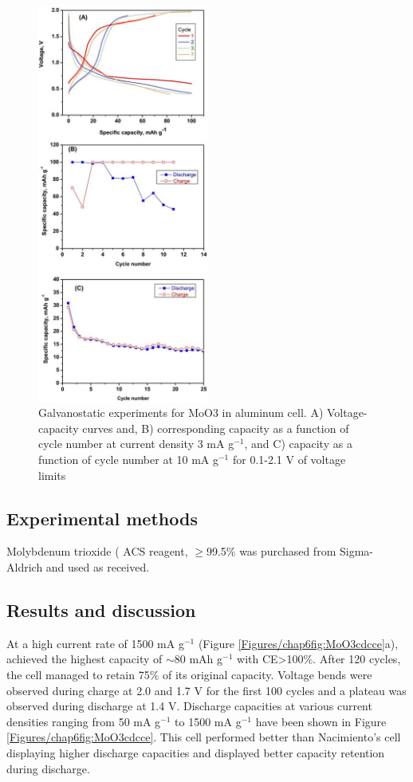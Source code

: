 \begin{figure}[th!]
\centering
\includegraphics[width=0.5\textwidth]{Figures/chap6fig/moo3pap}
\caption{Galvanostatic experiments for MoO3 in aluminum cell. A) Voltage-capacity curves and, B) corresponding capacity as a function of cycle number at current density 3 mA g$^{-1}$, and C) capacity as a function of cycle number at 10 mA g$^{-1}$ for 0.1-2.1 V of voltage limits \cite{nacimiento_exploring_2018}}
\label{Figures/chap6fig:moo3pap}
\end{figure}

\subsection{Experimental methods}
Molybdenum trioxide ( ACS reagent, $\geq$99.5\% was purchased from Sigma-Aldrich and used as received.

\subsection{Results and discussion}
At a high current rate of 1500 mA g$^{-1}$ (Figure \ref{Figures/chap6fig:MoO3cdcce}a), achieved the highest capacity of $\sim$80 mAh g$^{-1}$ with CE>100\%. After 120 cycles, the cell managed to retain 75\% of its original capacity. Voltage bends were observed during charge at 2.0 and 1.7 V for the first 100 cycles and a plateau was observed during discharge at 1.4 V. Discharge capacities at various current densities ranging from 50 mA g$^{-1}$ to 1500 mA g$^{-1}$ have been shown in Figure \ref{Figures/chap6fig:MoO3cdcce}. This cell performed better than Nacimiento's cell displaying higher discharge capacities and displayed better capacity retention during discharge.  

